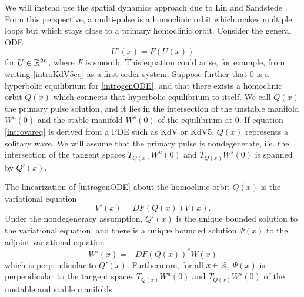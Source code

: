 \documentclass[thesis.tex]{subfiles}
\begin{document}
We will instead use the spatial dynamics approach due to Lin \cite{Lin1990} and Sandstede \cite{Sandstede1993,SandstedeStrut}. From this perspective, a multi-pulse is a homoclinic orbit which makes multiple loops but which stays close to a primary homoclinic orbit. Consider the general ODE
\begin{equation}\label{introgenODE}
U'(x) = F(U(x))
\end{equation}
for $U \in \mathbb{R}^{2n}$, where $F$ is smooth. This equation could arise, for example, from writing 
\cref{introKdV5eq} as a first-order system. Suppose further that 0 is a hyperbolic equilibrium for \cref{introgenODE}, and that there exists a homoclinic orbit $Q(x)$ which connects that hyperbolic equilibrium to itself. We call $Q(x)$ the primary pulse solution, and it lies in the intersection of the unstable manifold $W^u(0)$ and the stable manifold $W^s(0)$ of the equilibrium at 0. If equation \cref{introvareq} is derived from a PDE such as KdV or KdV5, $Q(x)$ represents a solitary wave. We will assume that the primary pulse is nondegenerate, i.e. the intersection of the tangent spaces $T_{Q(x)}W^u(0)$ and $T_{Q(x)}W^s(0)$ is spanned by $Q'(x)$.

The linearization of \cref{introgenODE} about the homoclinic orbit $Q(x)$ is the variational equation
\begin{equation}\label{introvareq}
V'(x) = DF(Q(x)) V(x).
\end{equation}
Under the nondegeneracy assumption, $Q'(x)$ is the unique bounded solution to the variational equation, and there is a unique bounded solution $\Psi(x)$ to the adjoint variational equation
\begin{equation}\label{introadjvareq}
W'(x) = -DF(Q(x))^* W(x)
\end{equation}
which is perpendicular to $Q'(x)$. Furthermore, for all $x \in \mathbb{R}$, $\Psi(x)$ is perpendicular to the tangent spaces $T_{Q(x)}W^u(0)$ and $T_{Q(x)}W^s(0)$ of the unstable and stable manifolds. 
\end{document}
